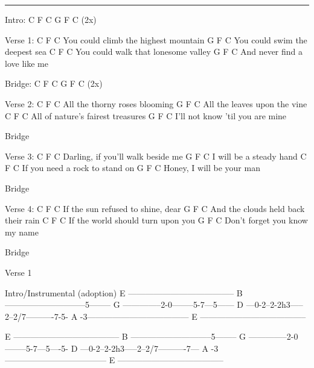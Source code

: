 \noindent\rule{\columnwidth}{1pt}

\begin{multicols}{2}
\begin{lstsong}
Intro: C  F C  G  F C (2x)

Verse 1:
 C                   F        C
You could climb the highest mountain
           G         F      C
You could swim the deepest sea
 C                   F        C
You could walk that lonesome valley
           G      F        C
And never find a love like me

Bridge: C  F C  G  F C (2x)

Verse 2:
 C              F      C
All the thorny roses blooming
          G      F       C
All the leaves upon the vine
 C                F       C
All of nature's fairest treasures
          G         F       C
I'll not know 'til you are mine

Bridge

Verse 3:
   C                F      C
Darling, if you'll walk beside me
       G      F     C
I will be a steady hand
C              F        C
If you need a rock to stand on
       G      F        C
Honey, I will be your man
\end{lstsong}
\columnbreak
\begin{lstsong}
Bridge
 
Verse 4:
C             F         C
If the sun refused to shine, dear
          G          F          C
And the clouds held back their rain
C                    F     C
If the world should turn upon you
          G       F       C
Don't forget you know my name

Bridge

Verse 1

\end{lstsong}
\begin{lsttab}
Intro/Instrumental (adoption)
E --------------------------------------
B -----------------------------5--------
G --------------2-0--------5-7---5------
D ---0-2--2-2h3-----2--2/7----------7-5-
A -3------------------------------------
E --------------------------------------

E --------------------------------------
B -----------------------------5--------
G --------------2-0--------5-7---5----5-
D ---0-2--2-2h3-----2--2/7----------7---
A -3------------------------------------
E --------------------------------------
\end{lsttab}
\end{multicols}
\newpage
